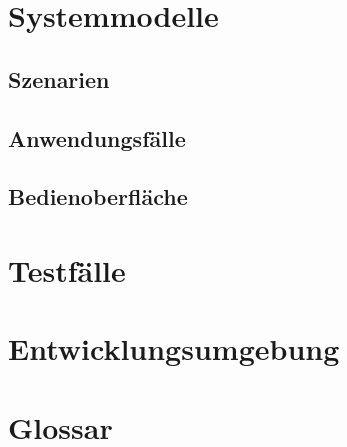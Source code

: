 \documentclass[a4paper]{scrreprt}
\begin{document}
    \chapter{Systemmodelle}
        \section{Szenarien}

        \newpage
        \section{Anwendungsfälle}

        \newpage
        \section{Bedienoberfläche}

    \chapter{Testfälle}
    
    \chapter{Entwicklungsumgebung}

	\chapter{Glossar}
	
    \glsaddall
    \printglossaries

    \listoffigures
\end{document}
